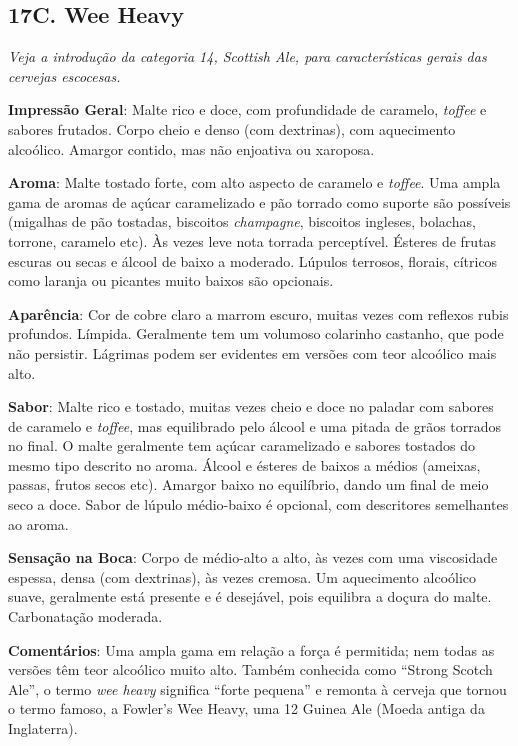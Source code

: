 \subsection*{17C. Wee Heavy}
\textit{Veja a introdução da categoria 14, Scottish Ale, para características gerais das cervejas escocesas.}

\textbf{Impressão Geral}: Malte rico e doce, com profundidade de caramelo, \textit{toffee} e sabores frutados. Corpo cheio e denso (com dextrinas), com aquecimento alcoólico. Amargor contido, mas não enjoativa ou xaroposa.

\textbf{Aroma}: Malte tostado forte, com alto aspecto de caramelo e \textit{toffee}. Uma ampla gama de aromas de açúcar caramelizado e pão torrado como suporte são possíveis (migalhas de pão tostadas, biscoitos \textit{champagne}, biscoitos ingleses, bolachas, torrone, caramelo etc). Às vezes leve nota torrada perceptível. Ésteres de frutas escuras ou secas e álcool de baixo a moderado. Lúpulos terrosos, florais, cítricos como laranja ou picantes muito baixos são opcionais.

\textbf{Aparência}: Cor de cobre claro a marrom escuro, muitas vezes com reflexos rubis profundos. Límpida. Geralmente tem um volumoso colarinho castanho, que pode não persistir. Lágrimas podem ser evidentes em versões com teor alcoólico mais alto.

\textbf{Sabor}: Malte rico e tostado, muitas vezes cheio e doce no paladar com sabores de caramelo e \textit{toffee}, mas equilibrado pelo álcool e uma pitada de grãos torrados no final. O malte geralmente tem açúcar caramelizado e sabores tostados do mesmo tipo descrito no aroma. Álcool e ésteres de baixos a médios (ameixas, passas, frutos secos etc). Amargor baixo no equilíbrio, dando um final de meio seco a doce. Sabor de lúpulo médio-baixo é opcional, com descritores semelhantes ao aroma.

\textbf{Sensação na Boca}: Corpo de médio-alto a alto, às vezes com uma viscosidade espessa, densa (com dextrinas), às vezes cremosa. Um aquecimento alcoólico suave, geralmente está presente e é desejável, pois equilibra a doçura do malte. Carbonatação moderada.

\textbf{Comentários}: Uma ampla gama em relação a força é permitida; nem todas as versões têm teor alcoólico muito alto. Também conhecida como “Strong Scotch Ale”, o termo \textit{wee heavy} significa “forte pequena” e remonta à cerveja que tornou o termo famoso, a Fowler’s Wee Heavy, uma 12 Guinea Ale (Moeda antiga da Inglaterra).

